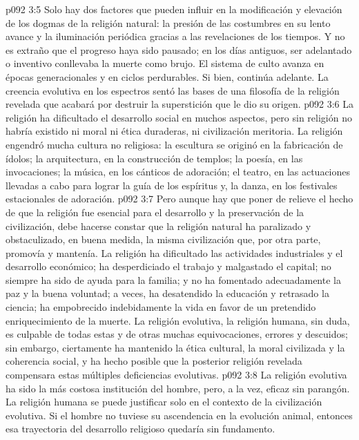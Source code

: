 \vs p092 3:5 Solo hay dos factores que pueden influir en la modificación y elevación de los dogmas de la religión natural: la presión de las costumbres en su lento avance y la iluminación periódica gracias a las revelaciones de los tiempos. Y no es extraño que el progreso haya sido pausado; en los días antiguos, ser adelantado o inventivo conllevaba la muerte como brujo. El sistema de culto avanza en épocas generacionales y en ciclos perdurables. Si bien, continúa adelante. La creencia evolutiva en los espectros sentó las bases de una filosofía de la religión revelada que acabará por destruir la superstición que le dio su origen.
\vs p092 3:6 La religión ha dificultado el desarrollo social en muchos aspectos, pero sin religión no habría existido ni moral ni ética duraderas, ni civilización meritoria. La religión engendró mucha cultura no religiosa: la escultura se originó en la fabricación de ídolos; la arquitectura, en la construcción de templos; la poesía, en las invocaciones; la música, en los cánticos de adoración; el teatro, en las actuaciones llevadas a cabo para lograr la guía de los espíritus y, la danza, en los festivales estacionales de adoración.
\vs p092 3:7 Pero aunque hay que poner de relieve el hecho de que la religión fue esencial para el desarrollo y la preservación de la civilización, debe hacerse constar que la religión natural ha paralizado y obstaculizado, en buena medida, la misma civilización que, por otra parte, promovía y mantenía. La religión ha dificultado las actividades industriales y el desarrollo económico; ha desperdiciado el trabajo y malgastado el capital; no siempre ha sido de ayuda para la familia; y no ha fomentado adecuadamente la paz y la buena voluntad; a veces, ha desatendido la educación y retrasado la ciencia; ha empobrecido indebidamente la vida en favor de un pretendido enriquecimiento de la muerte. La religión evolutiva, la religión humana, sin duda, es culpable de todas estas y de otras muchas equivocaciones, errores y descuidos; sin embargo, ciertamente ha mantenido la ética cultural, la moral civilizada y la coherencia social, y ha hecho posible que la posterior religión revelada compensara estas múltiples deficiencias evolutivas.
\vs p092 3:8 \pc La religión evolutiva ha sido la más costosa institución del hombre, pero, a la vez, eficaz sin parangón. La religión humana se puede justificar solo en el contexto de la civilización evolutiva. Si el hombre no tuviese su ascendencia en la evolución animal, entonces esa trayectoria del desarrollo religioso quedaría sin fundamento.
